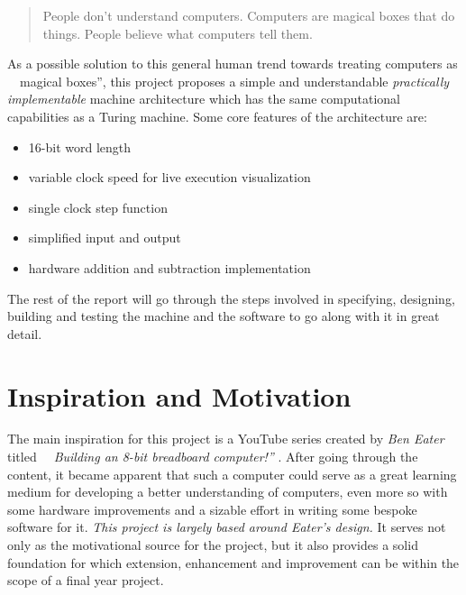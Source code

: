 \documentclass[11pt]{informatics-report}
\begin{document}
\begin{quotation}
People don't understand computers. Computers are magical boxes that do things. People believe what computers tell them. \cite{schneier2011secrets}
\end{quotation}
As a possible solution to this general human trend towards treating computers as ~~magical boxes'', this project proposes a simple and understandable \emph{practically implementable} machine architecture which has the same computational capabilities as a Turing machine. \linebreak
Some core features of the architecture are:
{\begin{itemize}
  \item 16-bit word length
  \item variable clock speed for live execution visualization
  \item single clock step function
  \item simplified input and output
  \item hardware addition and subtraction implementation
\end{itemize}}

The rest of the report will go through the steps involved in specifying, designing, building and testing the machine and the software to go along with it in great detail.
\pagebreak
\section{Inspiration and Motivation}
The main inspiration for this project is a YouTube series created by \emph{Ben Eater} titled \emph{~~Building an 8-bit breadboard computer!''} \cite{eater2019breadboard}. After going through the content, it became apparent that such a computer could serve as a great learning medium for developing a better understanding of computers, even more so with some hardware improvements and a sizable effort in writing some bespoke software for it. \emph{This project is largely based around Eater's design.} It serves not only as the motivational source for the project, but it also provides a solid foundation for which extension, enhancement and improvement can be within the scope of a final year project.
\end{document}
